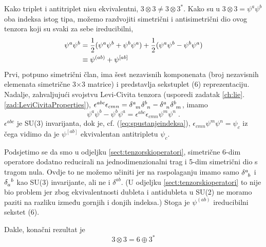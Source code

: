 \begin{primjer}[$3\otimes 3$]
Kako triplet i antitriplet nisu ekvivalentni, $3\otimes 3
\neq 3\otimes 3^*$. Kako su u
$3\otimes 3 = \psi^a \psi^b$ oba indeksa istog tipa,
možemo razdvojiti simetrični i antisimetrični dio ovog
tenzora koji su svaki za sebe ireducibilni,
\begin{align}
\psi^a \psi^b &= \frac{1}{2} (\psi^a\psi^b + \psi^b \psi^a)
               + \frac{1}{2} (\psi^a\psi^b - \psi^b \psi^a) \\
              &\equiv \psi^{(ab)} + \psi^{[ab]}
\end{align}
Prvi, potpuno simetrični član, ima šest nezavisnih komponenata
(broj nezavisnih elemenata simetrične 3$\times$3 matrice) i
predstavlja sekstuplet (6) reprezentaciju.
Nadalje, zahvaljujući svojstvu Levi-Civita tenzora
(usporedi zadatak \ref{ch:lie}.\ref{zad:LeviCivitaProperties}),
$\epsilon^{abc}\epsilon_{cmn} = 
\tensor{\delta}{^a_m}
\tensor{\delta}{^b_n} -
\tensor{\delta}{^a_n}
\tensor{\delta}{^b_m}$, imamo
\begin{equation}
\psi^a\psi^b - \psi^b \psi^a = \epsilon^{abc}\epsilon_{cmn}
\psi^m\psi^n \;.
\end{equation}
$\epsilon^{abc}$ je SU(3) invarijanta, dok je, cf. 
(\ref{eq:spustanjeindeksa}), $\epsilon_{cmn}\psi^{m}\psi^n = \psi_c$
iz čega vidimo da je $\psi^{[ab]}$ ekvivalentan antitripletu
$\psi_c$. 

Podsjetimo se da smo u odjeljku \ref{sect:tenzorskioperatori},
simetrične 6-dim operatore dodatno reducirali na jednodimenzionalni
trag i 5-dim simetrični dio s tragom nula.  Ovdje to ne možemo učiniti
jer na raspolaganju imamo samo 
$\tensor{\delta}{^a_b}$ i $\tensor{\delta}{_a^b}$ kao SU(3) invarijante, 
ali ne i $\delta^{ab}$. (U odjeljku \ref{sect:tenzorskioperatori}
to nije bio problem jer zbog ekvivalentnosti dubleta i antidubleta u
SU(2) ne moramo paziti na razliku između gornjih i donjih indeksa.)
Stoga je $\psi^{(ab)}$ ireducibilni sekstet (6).

Dakle, konačni rezultat je
\begin{equation}
 3 \otimes 3 = 6 \oplus 3^*
\label{eq:33eq63}
\end{equation}
\end{primjer}

